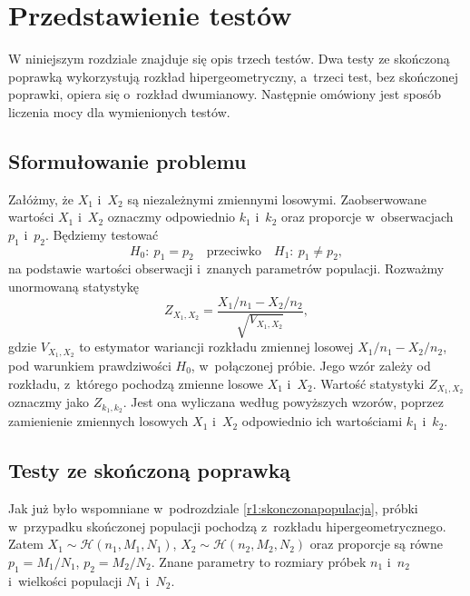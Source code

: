 \chapter{Przedstawienie testów}
\label{r2}
W niniejszym rozdziale znajduje się opis trzech testów. Dwa testy ze skończoną poprawką wykorzystują rozkład hipergeometryczny, a~trzeci test, bez skończonej poprawki, opiera się o~rozkład dwumianowy. Następnie omówiony jest sposób liczenia mocy dla wymienionych testów.

\section{Sformułowanie problemu}
Załóżmy, że $X_1$ i~$X_2$ są niezależnymi zmiennymi losowymi. Zaobserwowane wartości $X_1$ i~$X_2$ oznaczmy odpowiednio $k_1$ i~$k_2$ oraz proporcje w~obserwacjach $p_1$ i~$p_2$. Będziemy testować
\begin{equation}
H_0{:}\ p_1=p_2\quad \text{przeciwko} \quad H_1{:}\ p_1\neq p_2,
\end{equation}
na podstawie wartości obserwacji i~znanych parametrów populacji.
Rozważmy unormowaną statystykę
\begin{equation}
Z_{X_1,X_2} = \frac{X_1/n_1-X_2/n_2}{\sqrt{V_{X_1,X_2}}},
\end{equation}
gdzie $V_{X_1,X_2}$ to estymator wariancji rozkładu zmiennej losowej $X_1/n_1-X_2/n_2$, pod warunkiem prawdziwości $H_0$, w~połączonej próbie. Jego wzór zależy od rozkładu, z~którego pochodzą zmienne losowe $X_1$ i~$X_2$.
Wartość statystyki $Z_{X_1,X_2}$ oznaczmy jako $Z_{k_1,k_2}$. Jest ona wyliczana według powyższych wzorów, poprzez zamienienie zmiennych losowych $X_1$ i~$X_2$ odpowiednio ich wartościami $k_1$ i~$k_2$.

\section{Testy ze skończoną poprawką}
\label{r2:skonczonapoprawka}
Jak już było wspomniane w~podrozdziale \ref{r1:skonczonapopulacja}, próbki w~przypadku skończonej populacji pochodzą z~rozkładu hipergeometrycznego. Zatem $X_1\sim \mathcal{H}(n_1,M_1,N_1)$, $X_2\sim \mathcal{H}(n_2,M_2,N_2)$ oraz proporcje są równe $p_1=M_1/N_1$, $p_2=M_2/N_2$. Znane parametry to rozmiary próbek $n_1$ i~$n_2$ i~wielkości populacji $N_1$ i~$N_2$.

